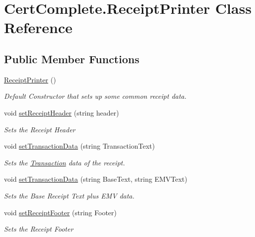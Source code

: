 \hypertarget{class_cert_complete_1_1_receipt_printer}{}\section{Cert\+Complete.\+Receipt\+Printer Class Reference}
\label{class_cert_complete_1_1_receipt_printer}
\subsection*{Public Member Functions}
\begin{DoxyCompactItemize}
\item 
\mbox{\hyperlink{class_cert_complete_1_1_receipt_printer_a70fb4378ea2d0f6857fa4e44036ba513}{Receipt\+Printer}} ()
\begin{DoxyCompactList}\small\item\em Default Constructor that sets up some common receipt data. \end{DoxyCompactList}\item 
void \mbox{\hyperlink{class_cert_complete_1_1_receipt_printer_a075af10a7b8bb31b0df5499bddb0554a}{set\+Receipt\+Header}} (string header)
\begin{DoxyCompactList}\small\item\em Sets the Receipt Header \end{DoxyCompactList}\item 
void \mbox{\hyperlink{class_cert_complete_1_1_receipt_printer_ab2d4ed5e88261754c3fc64710fa65a64}{set\+Transaction\+Data}} (string Transaction\+Text)
\begin{DoxyCompactList}\small\item\em Sets the \mbox{\hyperlink{class_cert_complete_1_1_transaction}{Transaction}} data of the receipt. \end{DoxyCompactList}\item 
void \mbox{\hyperlink{class_cert_complete_1_1_receipt_printer_af557b68b0786ec70501f8d56c39c1168}{set\+Transaction\+Data}} (string Base\+Text, string E\+M\+V\+Text)
\begin{DoxyCompactList}\small\item\em Sets the Base Receipt Text plus E\+MV data. \end{DoxyCompactList}\item 
void \mbox{\hyperlink{class_cert_complete_1_1_receipt_printer_a839da01b4b8a916893de53cb862638fb}{set\+Receipt\+Footer}} (string Footer)
\begin{DoxyCompactList}\small\item\em Sets the Receipt Footer \end{DoxyCompactList}\item 

\end{DoxyCompactItemize}
